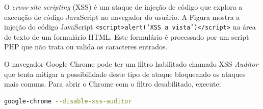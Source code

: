 \begin{frame}{}
O {\it cross-site scripting\/} (XSS) é um ataque de injeção de código que
explora a execução de código JavaScript no navegador do usuário.  A
Figura mostra a injeção do código JavaScript
{\tt <script>alert(`XSS a vista')</script>} na área de texto de um formulário
HTML. Este formulário é processado por um script PHP que não trata ou
valida os caracteres entrados. 


\end{frame}

\begin{frame}[fragile]{}

O navegador Google Chrome pode ter um filtro habilitado 
chamado XSS {\it Auditor\/} que
tenta mitigar a possibilidade deste tipo de ataque bloqueando os
ataques mais comuns. Para abrir o Chrome com o filtro desabilitado,
execute:

\begin{lstlisting}[language=bash]
 google-chrome --disable-xss-auditor
\end{lstlisting}

\end{frame}

